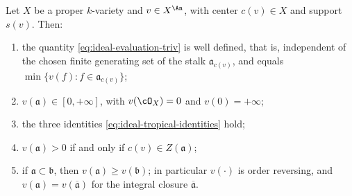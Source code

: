 \begin{proposition}
\label{prop:ch32-tropical-identities}
Let $X$ be a proper $k$-variety and $v\in X^{\An}$, with center
$c(v)\in X$ and support $s(v)$.  Then:
\begin{enumerate}
\item\label{itm:ch32-ti:welldef}
the quantity \eqref{eq:ideal-evaluation-triv} is well defined, that is,
independent of the chosen finite generating set of the stalk
$\mathfrak a_{c(v)}$, and equals $\min\{v(f):f\in\mathfrak a_{c(v)}\}$;
\item\label{itm:ch32-ti:nonneg}
$v(\mathfrak a)\in[0,+\infty]$, with $v(\cO_X)=0$ and $v(0)=+\infty$;
\item\label{itm:ch32-ti:identities}
the three identities \eqref{eq:ideal-tropical-identities} hold;
\item\label{itm:ch32-ti:center}
$v(\mathfrak a)>0$ if and only if $c(v)\in Z(\mathfrak a)$;
\item\label{itm:ch32-ti:monotone}
if $\mathfrak a\subset\mathfrak b$, then
$v(\mathfrak a)\geq v(\mathfrak b)$; in particular $v(\cdot)$ is order
reversing, and $v(\mathfrak a)=v(\overline{\mathfrak a})$ for the integral
closure $\overline{\mathfrak a}$.
\end{enumerate}
\end{proposition}

